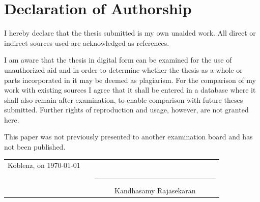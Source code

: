 \documentclass[a4paper, 11pt]{article}
\newcommand{\myName}{Kandhasamy Rajasekaran}
\begin{document}
\newpage
\section{Declaration of Authorship}
I hereby declare that the thesis submitted is my own unaided work. All direct or indirect sources used are acknowledged as references.

I am aware that the thesis in digital form can be examined for the use of unauthorized aid and in order to determine whether the thesis as a whole or parts incorporated in it may be deemed as plagiarism. For the comparison of my work with existing sources I agree that it shall be entered in a database where it shall also remain after examination, to enable comparison with future theses submitted. Further rights of reproduction and usage, however, are not granted here.

This paper was not previously presented to another examination board and has not been published.

\vspace{3cm}
\begin{tabular}{ccc}

  Koblenz, on \today &  &  \\
     &  & ---------------------------------------------------\\
   &  & \myName{}  \\
\end{tabular}
\end{document}

